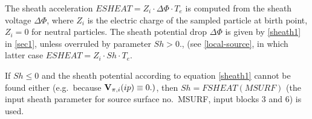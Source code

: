 The sheath acceleration $ESHEAT = Z_i \cdot \Delta \Phi \cdot T_e$  is computed
from the sheath voltage $\Delta \Phi$, where $Z_i$ is the electric charge of
the sampled particle at birth point, $Z_i=0$ for neutral particles.
The sheath potential drop $\Delta \Phi$ is given by \cref{sheath1} in
\cref{sec1}, unless overruled by parameter $Sh>0.
$, (see \cref{local-source}, in which latter case $ESHEAT=Z_i \cdot Sh \cdot
  T_e$.

If $Sh\leq 0$ and the sheath potential according to equation \cref{sheath1}
cannot be found either (e.g.\ because $\mathbf{V}_{\pi,i}(ip) \equiv 0.)
$, then $Sh = FSHEAT(MSURF)$ (the input sheath parameter for source surface
no.\ MSURF, input blocks 3 and 6) is used.
